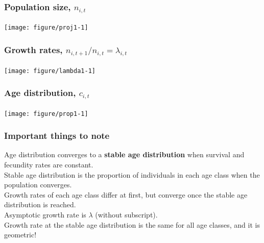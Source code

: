 \documentclass[color=usenames,dvipsnames]{beamer}\usepackage[]{graphicx}\usepackage[]{color}
\begin{document}
\begin{frame}[fragile]
  \frametitle{Population size, $n_{i,t}$}

\vspace{-0.9cm}
\begin{center}
  \texttt{[image: figure/proj1-1]}
\end{center}
\end{frame}




\begin{frame}[fragile]
  \frametitle{Growth rates, $n_{i,t+1}/n_{i,t} = \lambda_{i,t}$}

\vspace{-0.9cm}
\begin{center}
  \texttt{[image: figure/lambda1-1]}
\end{center}
\end{frame}




\begin{frame}[fragile]
  \frametitle{Age distribution, $c_{i,t}$}

\vspace{-0.9cm}
\begin{center}
  \texttt{[image: figure/prop1-1]}
\end{center}
\end{frame}









\begin{frame}
  \frametitle{Important things to note}
  \large
  Age distribution converges to a {\bf stable age
    distribution} when survival and fecundity rates are constant. \\
  \pause
  \vfill
  Stable age distribution is the proportion of individuals in each age
  class when the population converges. \\
  \pause
  \vfill
  Growth rates of each age class differ at first, but converge
  once the stable age distribution is reached. \\
  \pause
  \vfill
  Asymptotic growth rate is $\lambda$ (without subscript). \\
  \pause
  \vfill
  Growth rate at the stable age distribution is the same for
  all age classes, and it is geometric! \\
\end{frame}
\end{document}
